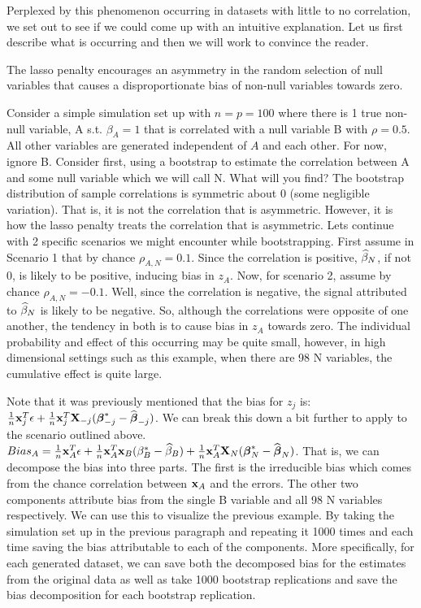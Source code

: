 Perplexed by this phenomenon occurring in datasets with little to no correlation, we set out to see if we could come up with an intuitive explanation. Let us first describe what is occurring and then we will work to convince the reader. 

The lasso penalty encourages an asymmetry in the random selection of null variables that causes a disproportionate bias of non-null variables towards zero. 

Consider a simple simulation set up with $n = p = 100$ where there is 1 true non-null variable, A s.t. $\beta_A = 1$ that is correlated with a null variable B with $\rho = 0.5$. All other variables are generated independent of $A$ and each other. For now, ignore B. Consider first, using a bootstrap to estimate the correlation between A and some null variable which we will call N. What will you find? The bootstrap distribution of sample correlations is symmetric about 0 (some negligible variation). That is, it is not the correlation that is asymmetric. However, it is how the lasso penalty treats the correlation that is asymmetric. Lets continue with 2 specific scenarios we might encounter while bootstrapping. First assume in Scenario 1 that by chance $\rho_{A,N} = 0.1$. Since the correlation is positive, $\widehat{\beta}_N$, if not 0, is likely to be positive, inducing bias in $z_A$. Now, for scenario 2, assume by chance $\rho_{A,N} = -0.1$. Well, since the correlation is negative, the signal attributed to $\widehat{\beta}_N$ is likely to be negative. So, although the correlations were opposite of one another, the tendency in both is to cause bias in $z_A$ towards zero. The individual probability and effect of this occurring may be quite small, however, in high dimensional settings such as this example, when there are 98 N variables, the cumulative effect is quite large. 

Note that it was previously mentioned that the bias for $z_j$ is: $\frac{1}{n}\mathbf{x}_j^T \epsilon + \frac{1}{n}\mathbf{x}_j^T \mathbf{X}_{-j}(\boldsymbol{\beta}^*_{-j} - \widehat{\boldsymbol{\beta}}_{-j})$. We can break this down a bit further to apply to the scenario outlined above. $Bias_A = \frac{1}{n}\mathbf{x}_A^T \epsilon + \frac{1}{n}\mathbf{x}_A^T \mathbf{x}_{B}(\beta^*_{B} - \widehat{\beta}_{B}) + \frac{1}{n}\mathbf{x}_A^T \mathbf{X}_{N}(\boldsymbol{\beta}^*_{N} - \widehat{\boldsymbol{\beta}}_{N})$. That is, we can decompose the bias into three parts. The first is the irreducible bias which comes from the chance correlation between $\mathbf{x}_A$ and the errors. The other two components attribute bias from the single B variable and all 98 N variables respectively. We can use this to visualize the previous example. By taking the simulation set up in the previous paragraph and repeating it 1000 times and each time saving the bias attributable to each of the components. More specifically, for each generated dataset, we can save both the decomposed bias for the estimates from the original data as well as take 1000 bootstrap replications and save the bias decomposition for each bootstrap replication. 

